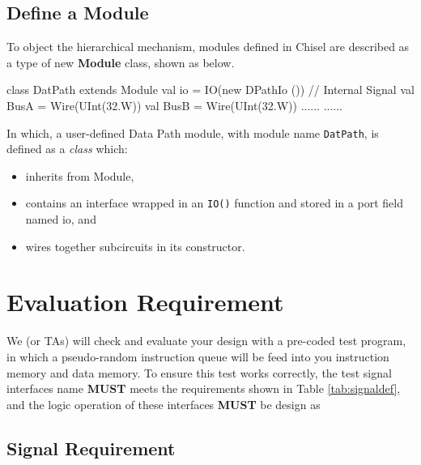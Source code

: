 \documentclass[a4paper]{article}
\def\code#1{{\tt #1}}
\begin{document}
\subsection{Define a Module} \label{sub:module}
To object the hierarchical mechanism, modules defined in Chisel are described as a type of new \textbf{Module} class, shown as below.
\begin{scala}
class DatPath extends Module {
	val io = IO(new DPathIo ())
	// Internal Signal
	val BusA 	= Wire(UInt(32.W))
	val BusB 	= Wire(UInt(32.W))
	......
	......
}
\end{scala}
In which, a user-defined Data Path module, with module name \code{DatPath}, is defined as a \textit{class} which:
\begin{itemize}
	\item inherits from Module,
	\item contains an interface wrapped in an \code{IO()} function and stored in a port field named io, and
	\item wires together subcircuits in its constructor.
\end{itemize}


\newpage
\section{Evaluation Requirement} \label{sec:Functions}%
We (or TAs) will check and evaluate your design with a pre-coded test program, in which a pseudo-random instruction queue will be feed into you instruction memory and data memory. To ensure this test works correctly, the test signal interfaces name \textbf{MUST} meets the requirements shown in Table \ref{tab:signaldef}, and the logic operation of these interfaces \textbf{MUST} be design as  
\subsection{Signal Requirement}\label{sub:signal}
\end{document}
